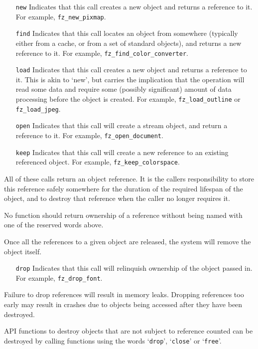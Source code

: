 \documentclass[oneside]{book}
\begin{document}
\begin{itemize}
\item[\texttt{new}] Indicates that this call creates a new object and returns a reference to it. For example, \texttt{fz\_new\_pixmap}.
\item[\texttt{find}] Indicates that this call locates an object from somewhere (typically either from a cache, or from a set of standard objects), and returns a new reference to it. For example, \texttt{fz\_find\_color\_converter}.
\item[\texttt{load}] Indicates that this call creates a new object and returns a reference to it. This is akin to `new', but carries the implication that the operation will read some data and require some (possibly significant) amount of data processing before the object is created. For example, \texttt{fz\_load\_outline} or \texttt{fz\_load\_jpeg}.
\item[\texttt{open}] Indicates that this call will create a stream object, and return a reference to it. For example, \texttt{fz\_open\_document}.
\item[\texttt{keep}] Indicates that this call will create a new reference to an existing referenced object. For example, \texttt{fz\_keep\_colorspace}.
\end{itemize}

All of these calls return an object reference. It is the callers responsibility to store this reference safely somewhere for the duration of the required lifespan of the object, and to destroy that reference when the caller no longer requires it.

No function should return ownership of a reference without being named with one of the reserved words above.

Once all the references to a given object are released, the system will remove the object itself.

\begin{itemize}
\item[\texttt{drop}] Indicates that this call will relinquish ownership of the object passed in. For example, \texttt{fz\_drop\_font}.
\end{itemize}

Failure to drop references will result in memory leaks. Dropping references too early may result in crashes due to objects being accessed after they have been destroyed.

API functions to destroy objects that are not subject to reference counted can be destroyed by calling functions using the words `\texttt{drop}', `\texttt{close}' or `\texttt{free}'.
\end{document}
